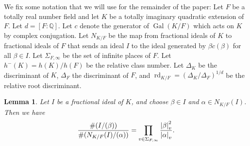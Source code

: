 \documentclass[12pt]{amsart}
\newcommand{\Gal}{\operatorname{Gal}}
\newtheorem{lemma}[theo]{Lemma}
\theoremstyle{remark}
\theoremstyle{definition}
\begin{document}
We fix some notation that we will use for the remainder of the paper: Let $F$ be a totally real number field and let $K$ be a totally imaginary quadratic extension of $F$. Let $d=[F:\mathbb Q]$. Let $c$ denote the generator of $\Gal(K/F)$ which acts on $K$ by complex conjugation. Let $N_{K/F}$ be the map from fractional ideals of $K$ to fractional ideals of $F$ that sends an ideal $I$ to the ideal generated by $\beta c(\beta)$ for all $\beta \in I$.  Let $\Sigma_{F,\infty}$ be the set of infinite places of $F$. Let $h^-(K)= h(K)/h(F)$ be the relative class number.  Let $\Delta_K$ be the discriminant of $K$, $\Delta_F$ the discriminant of $F$, and $\operatorname{rd}_{K/F} =( \Delta_K/\Delta_F)^{1/d}$ be the relative root discriminant. 


\begin{lemma}\label{index-formula} Let $I$ be a fractional ideal of $K$, and choose $\beta \in I$ and $\alpha \in N_{K/F}(I)$. Then we have 
\[ \frac{ \# (I/(\beta))}{ \#(N_{K/F}(I)/(\alpha))} =   \prod_{v \in \Sigma_{F,\infty}} \frac{ \abs{\beta}_v^2 }{ \abs{\alpha}_v}.\]
\end{lemma}
\end{document}
